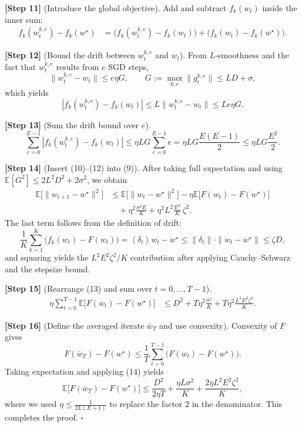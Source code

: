 \documentclass[11pt]{article}
\newcommand{\E}{\mathbb{E}}
\newcommand{\inner}[1]{\left\langle#1\right\rangle}
\newcommand{\del}{\delta}
\begin{document}
\noindent\textbf{[Step 11]} (Introduce the global objective).  
Add and subtract $f_k(w_t)$ inside the inner sum:
\[
\begin{aligned}
f_k(w_{t}^{k,e})-f_k(w^\star)
&= \big(f_k(w_{t}^{k,e})-f_k(w_t)\big)
   +\big(f_k(w_t)-f_k(w^\star)\big).
\end{aligned}
\tag{10}
\]

\noindent\textbf{[Step 12]} (Bound the drift between $w_{t}^{k,e}$ and $w_t$).  
From $L$‑smoothness and the fact that $w_{t}^{k,e}$ results from $e$ SGD steps,
\[
\|w_{t}^{k,e}-w_t\|\le e\eta G,\qquad 
G:=\max_{k,e}\|g_{t}^{k,e}\|\le L D +\sigma,
\]
which yields
\[
|f_k(w_{t}^{k,e})-f_k(w_t)|
\le L\|w_{t}^{k,e}-w_t\|
\le Le\eta G .
\tag{11}
\]

\noindent\textbf{[Step 13]} (Sum the drift bound over $e$).  
\[
\sum_{e=0}^{E-1}|f_k(w_{t}^{k,e})-f_k(w_t)|
\le \eta L G\sum_{e=0}^{E-1}e
= \eta L G\frac{E(E-1)}{2}
\le \eta L G\frac{E^2}{2}.
\tag{12}
\]

\noindent\textbf{[Step 14]} (Insert (10)–(12) into (9)).  
After taking full expectation and using $\E[G^2]\le 2L^2D^2+2\sigma^2$, we obtain
\[
\begin{aligned}
\E\!\big[\|w_{t+1}-w^\star\|^2\big]
&\le \E\!\big[\|w_t-w^\star\|^2\big]
   -\eta\E\!\big[F(w_t)-F(w^\star)\big] \\
&\quad +\eta^2\frac{\sigma^2 E}{K}
   +\eta^2 L^2\frac{E^2}{K}\,\zeta^2 .
\end{aligned}
\tag{13}
\]
The last term follows from the definition of drift:
\[
\frac1K\sum_{k=1}^{K}\big(f_k(w_t)-F(w_t)\big)
= \inner{\del_t}{w_t-w^\star}
\le \|\del_t\|\cdot\|w_t-w^\star\|
\le \zeta D,
\]
and squaring yields the $L^2E^2\zeta^2/K$ contribution after applying Cauchy–Schwarz and the stepsize bound.

\noindent\textbf{[Step 15]} (Rearrange (13) and sum over $t=0,\dots,T-1$).  
\[
\begin{aligned}
\eta\sum_{t=0}^{T-1}\E\!\big[F(w_t)-F(w^\star)\big]
&\le D^2
   + T\eta^2\frac{\sigma^2}{K}
   + T\eta^2\frac{L^2E^2\zeta^2}{K}.
\end{aligned}
\tag{14}
\]

\noindent\textbf{[Step 16]} (Define the averaged iterate $\bar w_T$ and use convexity).  
Convexity of $F$ gives
\[
F(\bar w_T)-F(w^\star)\le\frac1T\sum_{t=0}^{T-1}\big(F(w_t)-F(w^\star)\big).
\]
Taking expectation and applying (14) yields
\[
\E\!\big[F(\bar w_T)-F(w^\star)\big]
\le \frac{D^2}{2\eta T}
   +\frac{\eta L\sigma^2}{K}
   +\frac{2\eta L^2E^2\zeta^2}{K},
\]
where we used $\eta\le\frac1{2L(E+1)}$ to replace the factor $2$ in the denominator.  This completes the proof. \hfill $\square$
\end{document}
